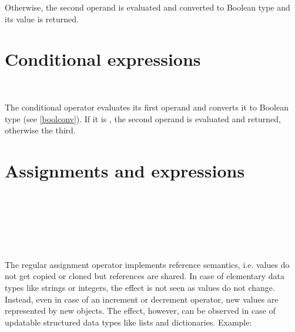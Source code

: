 Otherwise, the second operand is evaluated and converted to
Boolean type and its value is returned.

\section{Conditional expressions}

\begin{grammar}
      \produces {} \\
      \produces {} 
          \lextoken{:}
\end{grammar}

\noindent
The conditional operator  evaluates its first operand
and converts it to Boolean type (see \ref{boolconv}). If it
is , the second operand is evaluated and returned,
otherwise the third.

\section{Assignments and expressions}\label{assignments}

\begin{grammar}
      \produces {} \\
      \produces {} \lextoken{=}
          \\
      \produces {} \lextoken{\&=}
          \\
      \produces {} \lextoken{+=}
          \\
      \produces {} \lextoken{$-$=}
          \\
      \produces {}
\end{grammar}

\noindent
The regular assignment operator \token{=} implements reference semantics,
i.e. values do not get copied or cloned but references are shared. In
case of elementary data types like strings or integers, the effect is
not seen as values do not change. Instead, even in case of an increment
or decrement operator, new values are represented by new objects. The
effect, however, can be observed in case of updatable structured data types
like lists and dictionaries. Example:

